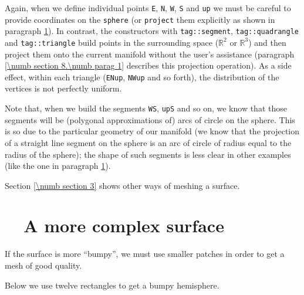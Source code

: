 Again, when we define individual points {\small\tt E}, {\small\tt N}, {\small\tt W},
{\small\tt S} and {\small\tt up} we must be careful to provide coordinates on the
{\small\tt sphere} (or {\small\tt project} them explicitly as shown in paragraph
\ref{\numb section 2.\numb parag 7}).
In contrast, the {\small\tt{}} constructors with {\small\tt\textcolor{tag}{tag}::segment},
{\small\tt\textcolor{tag}{tag}::quadrangle} and {\small\tt\textcolor{tag}{tag}::triangle}
build points in the surrounding space ($ \mathbb{R}^2 $ or $ \mathbb{R}^3 $) and
then project them onto the current manifold without the user's assistance (paragraph
\ref{\numb section 8.\numb parag 1} describes this projection operation).
As a side effect, within each triangle ({\small\tt ENup}, {\small\tt NWup} and so forth),
the distribution of the vertices is not perfectly uniform.

Note that, when we build the segments {\small\tt WS}, {\small\tt upS} and so on,
we know that those segments will be (polygonal approximations of) arcs of circle on the sphere.
This is so due to the particular geometry of our manifold (we know that the projection of
a straight line segment on the sphere is an arc of circle of radius equal to the radius of
the sphere); the shape of such segments is less clear in other examples
(like the one in paragraph \ref{\numb section 2.\numb parag 7}).

Section \ref{\numb section 3} shows other ways of meshing a surface.


\section{~~A more complex surface}\label{\numb section 2.\numb parag 7}

If the surface is more ``bumpy'',
we must use smaller patches in order to get a mesh of good quality.

Below we use twelve rectangles to get a bumpy hemisphere.

